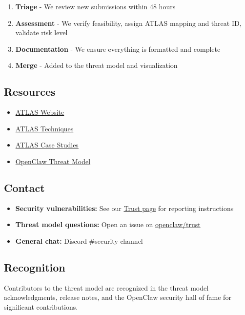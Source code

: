\begin{enumerate}
  \item \textbf{Triage} - We review new submissions within 48 hours
  \item \textbf{Assessment} - We verify feasibility, assign ATLAS mapping and threat ID, validate risk level
  \item \textbf{Documentation} - We ensure everything is formatted and complete
  \item \textbf{Merge} - Added to the threat model and visualization
\end{enumerate}


\subsection{Resources}


\begin{itemize}
  \item \href{https://atlas.mitre.org/}{ATLAS Website}
  \item \href{https://atlas.mitre.org/techniques/}{ATLAS Techniques}
  \item \href{https://atlas.mitre.org/studies/}{ATLAS Case Studies}
  \item \href{./THREAT-MODEL-ATLAS.md}{OpenClaw Threat Model}
\end{itemize}


\subsection{Contact}


\begin{itemize}
  \item \textbf{Security vulnerabilities:} See our \href{https://trust.openclaw.ai}{Trust page} for reporting instructions
  \item \textbf{Threat model questions:} Open an issue on \href{https://github.com/openclaw/trust/issues}{openclaw/trust}
  \item \textbf{General chat:} Discord \#security channel
\end{itemize}


\subsection{Recognition}


Contributors to the threat model are recognized in the threat model acknowledgments, release notes, and the OpenClaw security hall of fame for significant contributions.


